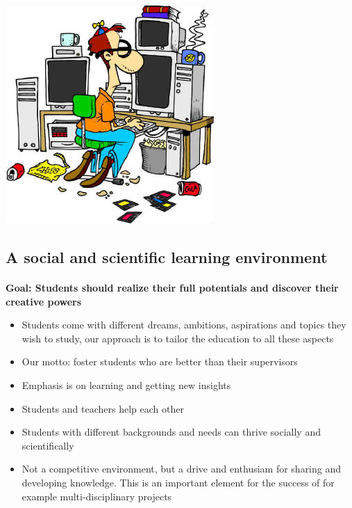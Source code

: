 \documentclass[%
twoside,                 %
final,                   %
10pt]{article}
\begin{document}


\centerline{\includegraphics[width=1.0\linewidth]{fig-future/computer_nerd2.jpg}}




\subsection{A social and scientific learning environment}


\paragraph{}
\textbf{Goal: Students should realize their full potentials and discover their creative powers}

\begin{itemize}
 \item Students come with different dreams, ambitions, aspirations and topics they wish to study, our approach is to tailor the education to all these aspects

 \item Our motto: foster students who are better than their supervisors

 \item Emphasis is on learning and getting new insights

 \item Students and teachers help each other

 \item Students with different backgrounds and needs can thrive socially and scientifically

 \item Not a competitive environment, but a drive and enthusiam for sharing and developing knowledge. This is an important element for the  success of for example multi-disciplinary projects 
\end{itemize}
\end{document}
